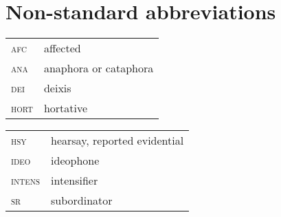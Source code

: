 \documentclass[output=paper,
modfonts,nonflat
]{langsci/langscibook}
\begin{document}
\section*{Non-standard abbreviations}

\begin{tabularx}{.42\textwidth}{lQ}
\textsc{afc} & affected \\
\textsc{ana} & anaphora or cataphora \\
\textsc{dei} & deixis \\
\textsc{hort} & hortative \\
\end{tabularx}
\begin{tabularx}{.55\textwidth}{lQ}
\textsc{hsy} & hearsay, reported evidential \\
\textsc{ideo} & ideophone \\
\textsc{intens} & intensifier \\
\textsc{sr} & subordinator \\
\end{tabularx}
 
{\sloppy
\largerpage
\printbibliography[heading=subbibliography,notkeyword=this]
}
\end{document}
